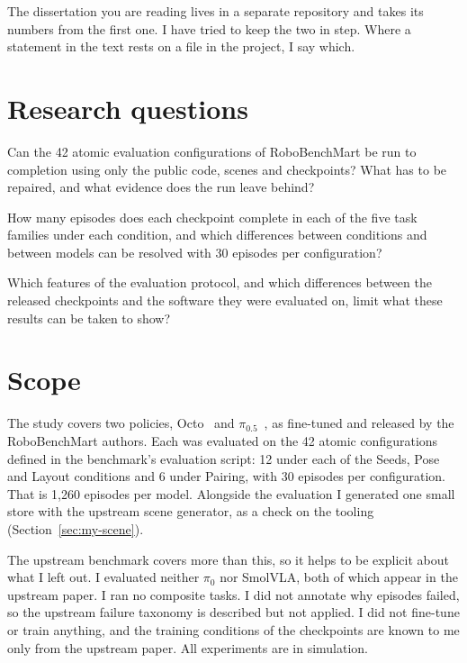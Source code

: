 The dissertation you are reading lives in a separate repository and takes its numbers from the first one. I have tried to keep the two in step. Where a statement in the text rests on a file in the project, I say which.

\section{Research questions}

\begin{description}[leftmargin=2.8em,style=nextline]
    \item[\textbf{RQ1}] Can the 42 atomic evaluation configurations of RoboBenchMart be run to completion using only the public code, scenes and checkpoints? What has to be repaired, and what evidence does the run leave behind?
    \item[\textbf{RQ2}] How many episodes does each checkpoint complete in each of the five task families under each condition, and which differences between conditions and between models can be resolved with 30 episodes per configuration?
    \item[\textbf{RQ3}] Which features of the evaluation protocol, and which differences between the released checkpoints and the software they were evaluated on, limit what these results can be taken to show?
\end{description}

\section{Scope}

The study covers two policies, Octo~\cite{octo_2023} and $\pi_{0.5}$~\cite{intelligence2025pi05visionlanguageactionmodelopenworld}, as fine-tuned and released by the RoboBenchMart authors. Each was evaluated on the 42 atomic configurations defined in the benchmark's evaluation script: 12 under each of the Seeds, Pose and Layout conditions and 6 under Pairing, with 30 episodes per configuration. That is 1,260 episodes per model. Alongside the evaluation I generated one small store with the upstream scene generator, as a check on the tooling (Section~\ref{sec:my-scene}).

The upstream benchmark covers more than this, so it helps to be explicit about what I left out. I evaluated neither $\pi_0$ nor SmolVLA, both of which appear in the upstream paper. I ran no composite tasks. I did not annotate why episodes failed, so the upstream failure taxonomy is described but not applied. I did not fine-tune or train anything, and the training conditions of the checkpoints are known to me only from the upstream paper. All experiments are in simulation.

